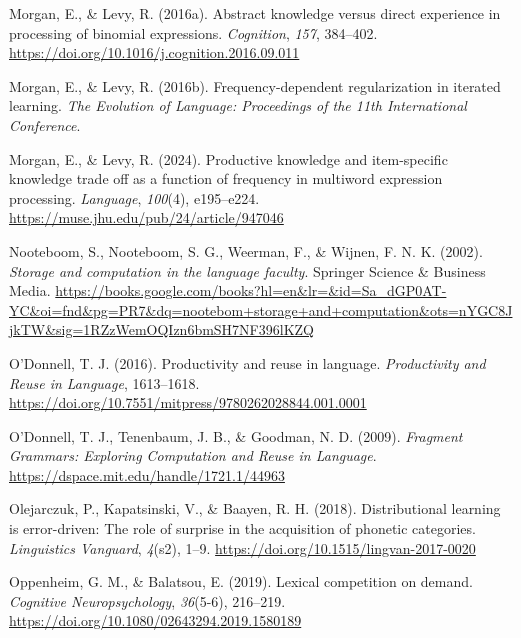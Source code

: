 \documentclass[
  12pt,
  letterpaper,
]{scrreprt}
\newlength{\cslhangindent}
\newenvironment{CSLReferences}[2] %
 {\begin{list}{}{%
  \setlength{\itemindent}{0pt}
  \setlength{\leftmargin}{0pt}
  \setlength{\parsep}{0pt}
  \ifodd #1
   \setlength{\leftmargin}{\cslhangindent}
   \setlength{\itemindent}{-1\cslhangindent}
  \fi
  \setlength{\itemsep}{#2\baselineskip}}}
 {\end{list}}
\begin{document}
\begin{CSLReferences}{1}{0}
Morgan, E., \& Levy, R. (2016a). Abstract knowledge versus direct
experience in processing of binomial expressions. \emph{Cognition},
\emph{157}, 384--402.
\url{https://doi.org/10.1016/j.cognition.2016.09.011}

Morgan, E., \& Levy, R. (2016b). Frequency-dependent regularization in
iterated learning. \emph{The Evolution of Language: Proceedings of the
11th International Conference}.

Morgan, E., \& Levy, R. (2024). Productive knowledge and item-specific
knowledge trade off as a function of frequency in multiword expression
processing. \emph{Language}, \emph{100}(4), e195--e224.
\url{https://muse.jhu.edu/pub/24/article/947046}

Nooteboom, S., Nooteboom, S. G., Weerman, F., \& Wijnen, F. N. K.
(2002). \emph{Storage and computation in the language faculty}. Springer
Science \& Business Media.
\url{https://books.google.com/books?hl=en&lr=&id=Sa_dGP0AT-YC&oi=fnd&pg=PR7&dq=nootebom+storage+and+computation&ots=nYGC8JjkTW&sig=1RZzWemOQIzn6bmSH7NF396lKZQ}

O'Donnell, T. J. (2016). Productivity and reuse in language.
\emph{Productivity and Reuse in Language}, 1613--1618.
\url{https://doi.org/10.7551/mitpress/9780262028844.001.0001}

O'Donnell, T. J., Tenenbaum, J. B., \& Goodman, N. D. (2009).
\emph{Fragment Grammars: Exploring Computation and Reuse in Language}.
\url{https://dspace.mit.edu/handle/1721.1/44963}

Olejarczuk, P., Kapatsinski, V., \& Baayen, R. H. (2018). Distributional
learning is error-driven: The role of surprise in the acquisition of
phonetic categories. \emph{Linguistics Vanguard}, \emph{4}(s2), 1--9.
\url{https://doi.org/10.1515/lingvan-2017-0020}

Oppenheim, G. M., \& Balatsou, E. (2019). Lexical competition on demand.
\emph{Cognitive Neuropsychology}, \emph{36}(5-6), 216--219.
\url{https://doi.org/10.1080/02643294.2019.1580189}


\end{CSLReferences}
\end{document}
